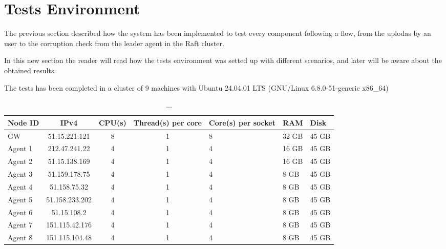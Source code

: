 \section{Tests Environment}

The previous section described how the system has been implemented to test every
component following a flow, from the uplodas by an user to the corruption check
from the leader agent in the Raft cluster.

In this new section the reader will read how the tests environment was
setted up with different scenarios, and later will be aware about the obtained
results.

The tests has been completed in a cluster of 9 machines with Ubuntu 24.04.01 LTS (GNU/Linux 6.8.0-51-generic x86_64)

\begin{table}[h!]
    \centering
    \begin{tabular}{|l|c|c|c|}
    \hline
       \textbf{Node ID} & \textbf{IPv4} & \textbf{CPU(s)} & \textbf{Thread(s) per core} &
       \textbf{Core(s) per socket} & \textbf{RAM} & \textbf{Disk} \\
       \hline
        GW & 51.15.221.121 & 8 & 1 & 8 & 32 GB & 45 GB \\

        Agent 1 & 212.47.241.22 & 4 & 1 & 4 & 16 GB & 45 GB \\
        Agent 2 & 51.15.138.169 & 4 & 1 & 4 & 16 GB & 45 GB \\
        Agent 3 & 51.159.178.75 & 4 & 1 & 4 & 8 GB & 45 GB \\
        Agent 4 & 51.158.75.32 & 4 & 1 & 4 & 8 GB & 45 GB \\
        Agent 5 & 51.158.233.202 & 4 & 1 & 4 & 8 GB & 45 GB \\
        Agent 6 & 51.15.108.2 & 4 & 1 & 4 & 8 GB & 45 GB \\
        Agent 7 & 151.115.42.176 & 4 & 1 & 4 & 8 GB & 45 GB \\
        Agent 8 & 151.115.104.48 & 4 & 1 & 4 & 8 GB & 45 GB \\
        \hline
    \end{tabular}
    \caption{...}
    \label{tab:test-vms-specs}
\end{table}

